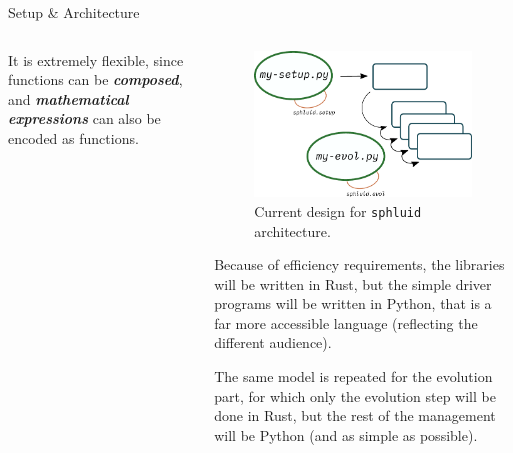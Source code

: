 \documentclass[9pt]{beamer}
\newcommand{\sphluid}{\texttt{sphluid}\xspace}
\begin{document}
\begin{frame}{Setup \& Architecture}
\begin{columns}
\begin{column}{0.5\textwidth}
            It is extremely flexible, since functions can be
            \textit{\textbf{composed}}, and \textbf{\textit{mathematical
            expressions}} can also be encoded as functions.
        \end{column}
        \begin{column}{0.5\textwidth}
            \begin{figure}[T]
                \includegraphics[width=0.8\hsize]{sphluid-arch}
                \caption{
                    Current design for \sphluid architecture.
                }
            \end{figure}

            Because of efficiency requirements, the libraries will be written
            in Rust, but the simple driver programs will be written in Python,
            that is a far more accessible language (reflecting the different
            audience).
            \vspace*{10pt}

            The same model is repeated for the evolution part, for which only
            the evolution step will be done in Rust, but the rest of the
            management will be Python (and as simple as possible).
        \end{column}
    \end{columns}
\end{frame}
\end{document}
